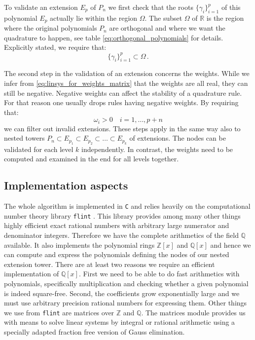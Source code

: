 \documentclass[a4paper,10pt]{article}
\begin{document}
To validate an extension $E_p$ of $P_n$ we first check that the roots $\{\gamma_i\}_{i=1}^p$ of
this polynomial $E_p$ actually lie within the region $\Omega$.
The subset $\Omega$ of $\mathbb{R}$ is the region where the original polynomials $P_n$ are orthogonal
and where we want the quadrature to happen, see table \ref{eq:orthogonal_polynomials} for details.
Explicitly stated, we require that:
\begin{equation}
  \{\gamma_i\}_{i=1}^p \subset \Omega \,.
\end{equation}

The second step in the validation of an extension concerns the weights.
While we infer from \eqref{eq:linsys_for_weights_matrix} that the weights are all
real, they can still be negative. Negative weights can affect the stability
of a quadrature rule. For that reason one usually drops rules having negative
weights. By requiring that:
\begin{equation}
  \omega_i > 0 \quad i=1, \ldots, p+n
\end{equation}
we can filter out invalid extensions.
These steps apply in the same way also to nested towers
$P_n \subset E_{p_1} \subset E_{p_2} \subset \ldots \subset E_{p_k}$
of extensions. The nodes can be validated for each level $k$ independently.
In contrast, the weights need to be computed and examined in the end for
all levels together.


\FloatBarrier
\subsection{Implementation aspects}
\label{sec:implementation_aspects}

The whole algorithm is implemented in \texttt{C} and relies heavily
on the computational number theory library \texttt{flint} \cite{flint, Hart2010}.
This library provides among many other things highly efficient exact rational
numbers with arbitrary large numerator and denominator integers. Therefore we
have the complete arithmetics of the field $\mathbb{Q}$ available. It also
implements the polynomial rings $\mathbb{Z}[x]$ and $\mathbb{Q}[x]$ and hence we
can compute and express the polynomials defining the nodes of our nested extension
tower. There are at least two reasons we require an efficient implementation of
$\mathbb{Q}[x]$. First we need to be able to do fast arithmetics with polynomials,
specifically multiplication and checking whether a given polynomial is indeed square-free.
Second, the coefficients grow exponentially large and we must use arbitrary precision
rational numbers for expressing them. Other things we use from \texttt{flint} are
matrices over $\mathbb{Z}$ and $\mathbb{Q}$. The matrices module provides us with means
to solve linear systems by integral or rational arithmetic using a specially adapted
fraction free version of Gauss elimination.
\end{document}
